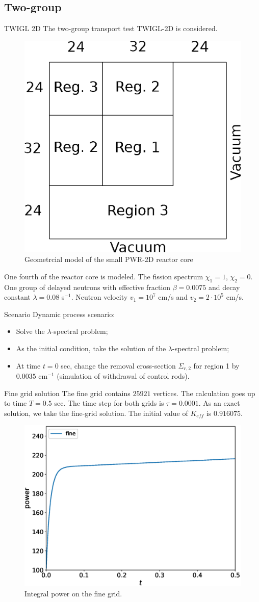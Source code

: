 \documentclass[10pt,pdf,hyperref={unicode}]{beamer}
\begin{document}
\subsection{Two-group}
	\begin{frame}{TWIGL 2D}
		The two-group transport test TWIGL-2D is considered.
		\begin{figure}[h]
			\centering
			\includegraphics[width=0.3\linewidth] {twigl/twigl_geo.eps}
			\caption{Geometrcial model of the small PWR-2D reactor core}
		\end{figure} 
		One fourth of the reactor core is modeled.
		The fission spectrum  $\chi_1 = 1$, $\chi_2 = 0$.
		One group of delayed neutrons with eﬀective fraction $\beta = 0.0075$ and decay constant $\lambda = 0.08$ s$^{-1}$. 
		Neutron velocity $v_1 = 10^7$ cm/s and $v_2 = 2 \cdot 10^5$ cm/s.
	\end{frame}

	\begin{frame}{Scenario}
		Dynamic process scenario:
		\begin{itemize}
			\item Solve the $\lambda$-spectral problem;
			\item As the initial condition, take the solution of the $\lambda$-spectral problem;
			\item At time $t = 0$ sec, change the removal cross-section $\Sigma_{r,2}$ for region 1 by $0.0035$ cm$^{-1}$ (simulation of withdrawal of control rods).
		\end{itemize}
	\end{frame}

	\begin{frame}{Fine grid solution}
		The fine grid contains $25921$ vertices.
		The calculation goes up to time $T = 0.5$ sec.
		The time step for both grids is $\tau = 0.0001$.
		As an exact solution, we take the fine-grid solution.
		The initial value of $K_{eff}$ is $0.916075$.
				
		\begin{figure}[h]
			\centering
			\includegraphics[width=0.5\linewidth]{twigl/power_fine.eps} 
			\caption{Integral power on the fine grid.}
		\end{figure}		
	\end{frame}
\end{document}
